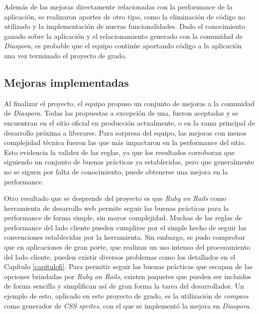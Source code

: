 Además de las mejoras directamente relacionadas con la performance de la aplicación, se realizaron aportes de otro tipo, como la eliminación de código no utilizado y la implementación de nuevas
funcionalidades. Dado el conocimiento ganado sobre la aplicación y el relacionamiento generado con la comunidad de \emph{Diaspora}, es probable que el equipo continúe aportando código a la aplicación una vez terminado el proyecto de grado. 

\subsection{Mejoras implementadas}

Al finalizar el proyecto, el equipo propuso un conjunto de mejoras a la comunidad de \emph{Diaspora}. Todas las propuestas a excepción de una, fueron aceptadas y se encuentran en el sitio oficial en producción actualmente, o en la rama principal de desarrollo próxima a liberarse.
Para sorpresa del equipo, las mejoras con menos complejidad técnica fueron las que más impactaron en la performance del sitio. 
Esto evidencia la validez de las reglas, ya que los resultados corroboran que siguiendo un conjunto de buenas prácticas ya establecidas, pero que generalmente
no se siguen por falta de conocimiento, puede obtenerse una mejora en la performance.

Otro resultado que se desprende del proyecto es que \emph{Ruby on Rails} como herramienta de desarrollo web permite seguir las buenas prácticas para la performance de forma simple, sin mayor complejidad.
Muchas de las reglas de performance del lado cliente pueden cumplirse por el simple hecho de seguir las convenciones establecidas por la herramienta. Sin embargo, se pudo comprobar que en aplicaciones de gran porte, que realizan un uso intenso del procesamiento del lado cliente, pueden existir diversos problemas como los detallados en el Capítulo \ref{capitulo6}. 
Para permitir seguir las buenas prácticas que escapan de las opciones brindadas por \emph{Ruby on Rails}, existen paquetes que pueden ser incluidos de forma sencilla y simplifican así de gran forma la tarea del desarrollador. 
Un ejemplo de esto, aplicado en este proyecto de grado, es la utilización de \emph{compass} como generador de \emph{CSS sprites}, con el que se implementó la mejora en \emph{Diaspora}. 

